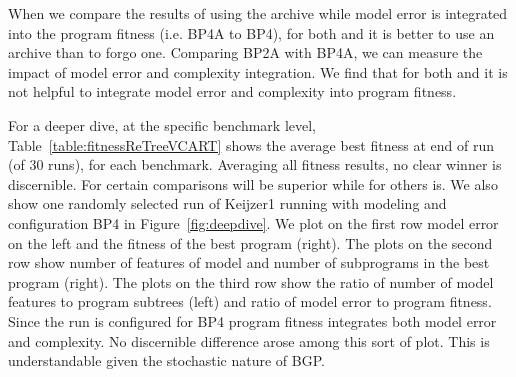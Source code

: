 When we compare the results of using the archive while model error is integrated into the program fitness (i.e.  BP4A to BP4), for both \REPTREE and \SCIKIT it is better to use an archive than to forgo one.  Comparing BP2A with BP4A, we can measure the impact of model error and complexity integration.  We find that for both \SCIKIT and \REPTREE it is not helpful to integrate model error and complexity into program fitness. 

For a deeper dive, at the specific benchmark level, Table~\ref{table:fitnessReTreeVCART} shows the average best fitness at end of run (of 30 runs), for each benchmark.   Averaging all fitness results, no clear winner is  discernible. For certain comparisons \SCIKIT will be superior while for others \REPTREE is.   We also show one randomly selected run of Keijzer1 running with \REPTREE modeling and configuration BP4 in Figure~\ref{fig:deepdive}.   We plot on the first row  model error on the left and the fitness of the best program (right).  The plots on the second row show number of features of model  and number of subprograms in the best program (right). The plots on the third row show the ratio of number of model features to program subtrees (left) and ratio of model error to program fitness. Since the run is configured for  BP4 program fitness integrates both model error and complexity.  No discernible difference arose among this sort of plot. This is understandable given the stochastic nature of BGP.



